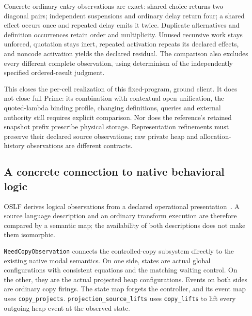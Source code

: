 \documentclass[11pt]{article}
\newcommand{\code}[1]{\texttt{\small #1}}
\begin{document}
Concrete ordinary-entry observations are exact: shared choice returns two
diagonal pairs; independent suspensions and ordinary delay return four;
a shared effect occurs once and repeated delay emits it twice. Duplicate
alternatives and definition occurrences retain order and multiplicity.
Unused recursive work stays unforced, quotation stays inert, repeated
activation repeats its declared effects, and noncode activation yields
the declared residual. The comparison also excludes every different
complete observation, using determinism of the independently specified
ordered-result judgment.

This closes the per-cell realization of this fixed-program, ground client.
It does not close full Prime: its combination with contextual open
unification, the quoted-lambda binding profile, changing definitions,
queries and external authority still requires explicit comparison. Nor
does the reference's retained snapshot prefix prescribe physical storage.
Representation refinements must preserve their declared source observations;
raw private heap and allocation-history observations are different contracts.

\subsection{A concrete connection to native behavioral logic}

OSLF derives logical observations from a declared operational
presentation~\cite{logic-distributive}. A source language description and an
ordinary transform execution are therefore compared by a semantic map;
the availability of both descriptions does not make them isomorphic.

\code{NeedCopyObservation} connects the controlled-copy subsystem directly
to the existing native modal semantics. On one side, states are actual
global configurations with consistent equations and the matching waiting
control. On the other, they are the actual projected heap configurations.
Events on both sides are ordinary copy firings. The state map forgets the
controller, and its event map uses \code{copy\_projects}.
\code{projection\_source\_lifts} uses \code{copy\_lifts} to lift every
outgoing heap event at the observed state.
\end{document}
